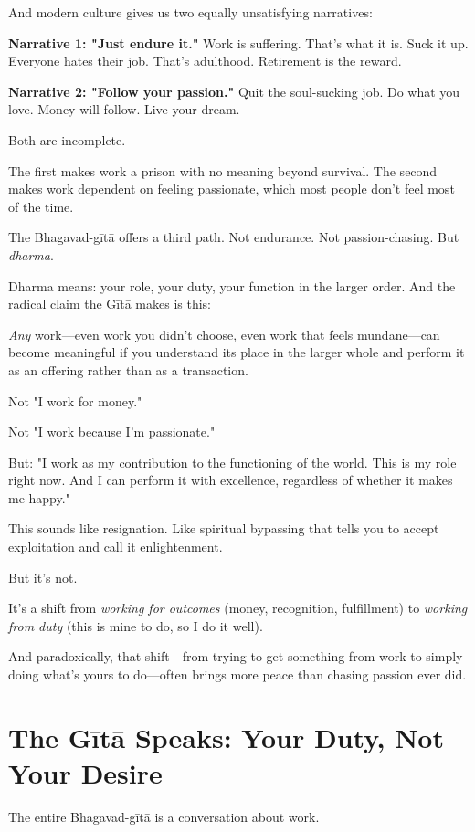\documentclass[11pt,twoside]{book}
\begin{document}
And modern culture gives us two equally unsatisfying narratives:

\textbf{\textbf{Narrative 1: "Just endure it."}} Work is suffering. That's what it is. Suck it up. Everyone hates their job. That's adulthood. Retirement is the reward.

\textbf{\textbf{Narrative 2: "Follow your passion."}} Quit the soul-sucking job. Do what you love. Money will follow. Live your dream.

Both are incomplete.

The first makes work a prison with no meaning beyond survival. The second makes work dependent on feeling passionate, which most people don't feel most of the time.

The Bhagavad-gītā offers a third path. Not endurance. Not passion-chasing. But \emph{dharma}.

Dharma means: your role, your duty, your function in the larger order. And the radical claim the Gītā makes is this:

\emph{Any} work—even work you didn't choose, even work that feels mundane—can become meaningful if you understand its place in the larger whole and perform it as an offering rather than as a transaction.

Not "I work for money."

Not "I work because I'm passionate."

But: "I work as my contribution to the functioning of the world. This is my role right now. And I can perform it with excellence, regardless of whether it makes me happy."

This sounds like resignation. Like spiritual bypassing that tells you to accept exploitation and call it enlightenment.

But it's not.

It's a shift from \emph{working for outcomes} (money, recognition, fulfillment) to \emph{working from duty} (this is mine to do, so I do it well).

And paradoxically, that shift—from trying to get something from work to simply doing what's yours to do—often brings more peace than chasing passion ever did.

\section*{The Gītā Speaks: Your Duty, Not Your Desire}

The entire Bhagavad-gītā is a conversation about work.
\end{document}
